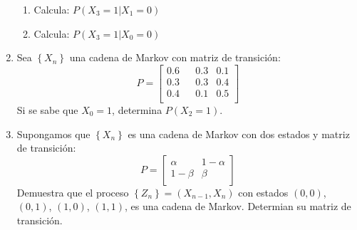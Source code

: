 \documentclass{report}
\begin{document}
\begin{enumerate}
\begin{enumerate}
              \item Calcula: $P\left(\left. X_3 = 1\right\vert X_1=0\right)$
              \item Calcula: $P\left(\left. X_3 = 1\right\vert X_0=0\right)$
          \end{enumerate}
    \item Sea $\left\{X_n\right\}$ una cadena de Markov con matriz de transición:
          $$P= \left[
                  \begin{matrix}
                      0.6 &  & 0.3 & 0.1 \\
                      0.3 &  & 0.3 & 0.4 \\
                      0.4 &  & 0.1 & 0.5 \\
                  \end{matrix}
                  \right]
          $$
          Si se sabe que $X_0=1$, determina $P(X_2 = 1)$.
    \item Supongamos que $\left\{X_n\right\}$ es una cadena de Markov con dos estados y matriz de transición:
          $$P= \left[
                  \begin{matrix}
                      \alpha  & 1-\alpha \\
                      1-\beta & \beta    \\
                  \end{matrix}
                  \right]
          $$
          Demuestra que el proceso $\left\{Z_n\right\}= (X_{n-1}, X_n)$ con estados $(0,0)$, $(0,1)$, $(1,0)$, $(1,1)$, es una cadena de Markov. Determian su matriz de transición.
          
\end{enumerate}
\end{document}
